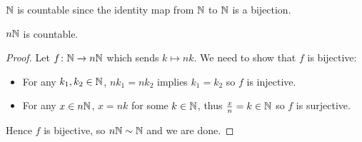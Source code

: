 \begin{comment}
Since $x\in S$ if and only if $\chi_S(x)=1$, it follows that
\[ |S|=\sum_{x\in U}\chi_S(x). \]
To prove the PIE, we calculate
\begin{align*}
&|S_1\cup\cdots\cup S_n|\\
&=\sum_{x\in U}\chi_{S_1\cup\cdots\cup S_n}(x)\\
&=\sum_{x\in U}1-\brac{1-\chi_{S_1}(x)}\cdots\brac{1-\chi_{S_n}(x)}\\
&=\brac{\chi_{S_1}(x)+\cdots+\chi_{S_n}(x)}-\brac{\chi_{S_1}(x)\chi_{S_2}(x)+\cdots+\chi_{S_{n-1}}(x)\chi_{S_n}(x)}+\cdots+(-1)^{n+1}\chi_{S_1}(x)\cdots\chi_{S_n}(x)\\
&=\brac{\chi_{S_1}(x)+\cdots+\chi_{S_n}(x)}-\brac{\chi_{S_1\cap S_2}(x)+\cdots+\chi_{S_{n-1}\cap S_n}(x)}+\cdots+(-1)^{n+1}\chi_{S_1\cap\cdots\cap S_n}(x)\\
&=\sum_{i=1}^n|S_i|-\sum_{J\subset\{1,\dots,n\},|J|=2}\absolute{\bigcap_{j\in J}S_j}+\cdots+(-1)^{k+1}\sum_{J\subset\{1,\dots,n\},|J|=k}\absolute{\bigcap_{j\in J}S_j}+\cdots+(-1)^{n+1}\absolute{\bigcap_{i=1}^nS_i}.
\end{align*}
\end{proof}

\subsection{Countability}
For two finite sets $A$ and $B$, we evidently have $A\sim B$ if and only if $A$ and $B$ contain the same number of elements. For infinite sets, however, the idea of ``having the same number of elements'' becomes quite vague, whereas the notion of bijectivity retains its clarity.
\end{comment}

\begin{example}
$\mathbb N$ is countable since the identity map from $\mathbb N$ to $\mathbb N$ is a bijection.
\end{example}

\begin{example}
$n\mathbb N$ is countable.
\begin{proof}
Let $f\colon\mathbb N\to n\mathbb N$ which sends $k\mapsto nk$. We need to show that $f$ is bijective:
\begin{itemize}
\item For any $k_1,k_2\in\mathbb N$, $nk_1=nk_2$ implies $k_1=k_2$ so $f$ is injective.
\item For any $x\in n\mathbb N$, $x=nk$ for some $k\in\mathbb N$, thus $\frac{x}{n}=k\in\mathbb N$ so $f$ is surjective.
\end{itemize}
Hence $f$ is bijective, so $n\mathbb N\sim\mathbb N$ and we are done.
\end{proof}
\end{example}

